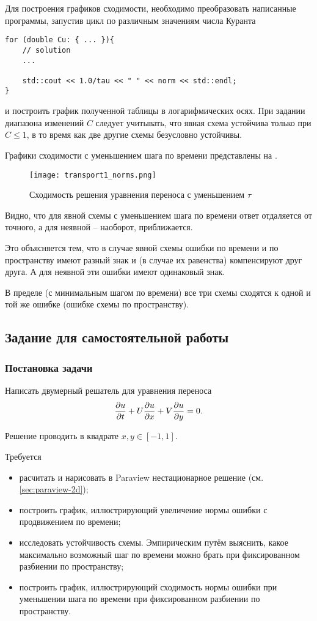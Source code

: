 Для построения графиков сходимости, необходимо преобразовать
написанные программы, запустив цикл по различным значениям числа Куранта
\begin{verbatim}
for (double Cu: { ... }){
    // solution
    ...

    std::cout << 1.0/tau << " " << norm << std::endl;
}
\end{verbatim}
и построить график полученной таблицы в логарифмических осях.
При задании диапазона изменений $C$ следует учитывать, что явная схема устойчива только при $C \leq 1$,
в то время как две другие схемы безусловно устойчивы.

Графики сходимости с уменьшением шага по времени
представлены на .

\begin{figure}[h]
\centering
\texttt{[image: transport1\_norms.png]}
\caption{Сходимость решения уравнения переноса с уменьшением $\tau$}
\label{fig:transport1_norms}
\end{figure}

Видно, что для явной схемы с уменьшением шага по времени
ответ отдаляется от точного, а для неявной -- наоборот, приближается.

Это объясняется тем, что в случае явной схемы
ошибки по времени и по пространству имеют разный знак
и (в случае их равенства) компенсируют друг друга.
А для неявной эти ошибки имеют одинаковый знак.

В пределе (с минимальным шагом по времени) все три схемы
сходятся к одной и той же ошибке (ошибке схемы по пространству).


\subsection{Задание для самостоятельной работы}
\subsubsection{Постановка задачи}
Написать двумерный решатель для уравнения переноса
\begin{equation*}
    \frac{\partial u}{\partial t} + U \frac{\partial u}{\partial x} + V \frac{\partial u}{\partial y} = 0.
\end{equation*}

Решение проводить в квадрате $x,y\in[-1,1]$.

Требуется
\begin{itemize}
\item расчитать и нарисовать в Paraview нестационарное решение (см. \ref{sec:paraview-2d});
\item построить график, иллюстрирующий увеличение нормы ошибки
      с продвижением по времени;
\item исследовать устойчивость схемы. Эмпирическим путём выяснить,
      какое максимально возможный шаг по времени можно брать
      при фиксированном разбиении по пространству;
\item построить график, иллюстрирующий сходимость нормы
      ошибки при уменьшении шага по времени при фиксированном разбиении
      по пространству.
\end{itemize}

